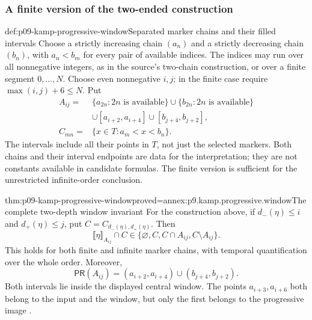 \subsubsection{A finite version of the two-ended construction}

\begin{hbdefinition}{def:p09-kamp-progressive-window}{Separated marker chains and their filled intervals}
Choose a strictly increasing chain \((a_n)\) and a strictly decreasing chain
\((b_n)\), with \(a_n<b_m\) for every pair of available
indices. The indices may run over all nonnegative integers, as in
the source's two-chain construction, or over a finite segment
\(0,\ldots,N\). Choose even nonnegative \(i,j\); in the
finite case require \(\max(i,j)+6\leq N\). Put
\[
\begin{aligned}
 A_{ij}={}&\{a_{2n}:2n\text{ is available}\}
       \cup\{b_{2n}:2n\text{ is available}\}\\
       &\cup[a_{i+2},a_{i+4}]
        \cup[b_{j+4},b_{j+2}],\\
 C_{mn}={}&\{x\in T:a_m<x<b_n\}.
\end{aligned}
\]
The intervals include all their points in \(T\), not just the
selected markers. Both chains and their interval endpoints are
data for the interpretation; they are not constants available in
candidate formulas. The finite version is sufficient for the
unrestricted infinite-order conclusion.
\end{hbdefinition}

\begin{hblemma}{thm:p09-kamp-progressive-window}{proved=annex:p9.kamp.progressive.window}{The complete two-depth window invariant}
For the construction above, if
\(d_-(\eta)\leq i\) and \(d_+(\eta)\leq j\), put
\(C=C_{d_-(\eta),d_+(\eta)}\). Then
\[
 \llbracket\eta\rrbracket_{A_{ij}}\cap C
              \in\{\varnothing,C,C\cap A_{ij},C\setminus A_{ij}\}.
\]
This holds for both finite and infinite marker chains, with temporal
quantification over the whole order. Moreover,
\[
 \mathsf{PR}(A_{ij})
       =(a_{i+2},a_{i+4})\cup(b_{j+4},b_{j+2}).
\]
Both intervals lie inside the displayed central window. The points
\(a_{i+3},a_{i+6}\) both belong to the input and the window,
but only the first belongs to the progressive image
\cite[p.~117]{Kamp1968}.
\end{hblemma}

